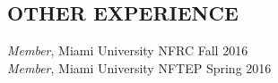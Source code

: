 \documentclass[margin, 10pt]{res}\usepackage[]{graphicx}\usepackage[]{color}
\begin{document}
\begin{resume}
  
  \section{OTHER EXPERIENCE} 

{\it Member}, Miami University NFRC \hfill  Fall 2016 \\
{\it Member}, Miami University NFTEP \hfill  Spring 2016  \\

  
  \end{resume}
\end{document}

